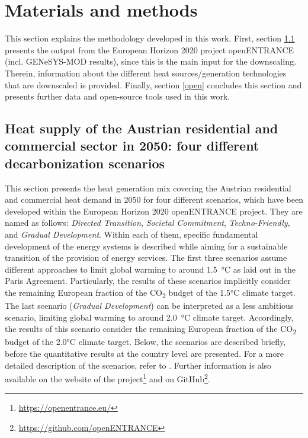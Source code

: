 \section{Materials and methods}\label{methodology}
This section explains the methodology developed in this work. First, section \ref{res:1} presents the output from the European Horizon 2020 project openENTRANCE (incl. GENeSYS-MOD results), since this is the main input for the downscaling. Therein, information about the different heat sources/generation technologies that are downscaled is provided.  Finally, section \ref{open} concludes this section and presents further data and open-source tools used in this work.

\subsection{Heat supply of the Austrian residential and commercial sector in 2050: four different decarbonization scenarios}\label{res:1}
This section presents the heat generation mix covering the Austrian residential and commercial heat demand in 2050 for four different scenarios, which have been developed within the European Horizon 2020 openENTRANCE project. They are named as follows: \textit{Directed Transition}, \textit{Societal Commitment}, \textit{Techno-Friendly}, and \textit{Gradual Development}. Within each of them, specific fundamental development of the energy systems is described while aiming for a sustainable transition of the provision of energy services. The first three scenarios assume different approaches to limit global warming to around \SI{1.5}{\degreeCelsius} as laid out in the Paris Agreement. Particularly, the results of these scenarios implicitly consider the remaining European fraction of the CO\textsubscript{2} budget of the 1.5°C climate target. The last scenario (\textit{Gradual Development}) can be interpreted as a less ambitious scenario, limiting global warming to around \SI{2.0}{\degreeCelsius} climate target. Accordingly, the results of this scenario consider the remaining European fraction of the CO\textsubscript{2} budget of the 2.0°C climate target. Below, the scenarios are described briefly, before the quantitative results at the country level are presented. For a more detailed description of the scenarios, refer to \cite{auer2020quantitative, auer2020development, hainsch2022energy}. Further information is also available on the website of the project\footnote{\url{https://openentrance.eu/}} and on GitHub\footnote{\url{https://github.com/openENTRANCE}}.\vspace{0.3cm}


